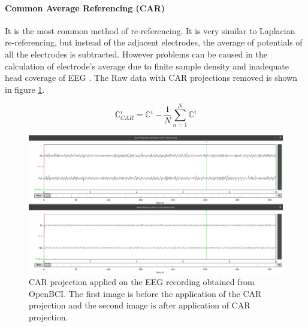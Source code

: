 \paragraph{Common Average Referencing (CAR)}
It is the most common method of re-referencing. It is very similar to Laplacian re-referencing, but instead of the adjacent electrodes, the average of potentials of all the electrodes is subtracted. However problems can be caused in the calculation of electrode's average due to finite sample density and inadequate head coverage of EEG \cite{2022_MI_DL_Old_Survey}. The Raw data with CAR projections removed is shown in figure \ref{fig:obci_car}.

\begin{equation} \label{eq:car_eeg}
    \mathbb{C}^{i}_{CAR} =  \mathbb{C}^{i} - \frac{1}{N} \sum_{n = 1}^{N} \mathbb{C}^{i}
\end{equation}

\begin{figure}[H] 
    \begin{center}
    \includegraphics[height=0.6\textwidth]{images/obci_car.png}
    \caption{CAR projection applied on the EEG recording obtained from OpenBCI. The first image is before the application of the CAR projection and the second image is after application of CAR projection.}
    \label{fig:obci_car}
\end{center}
\end{figure}

